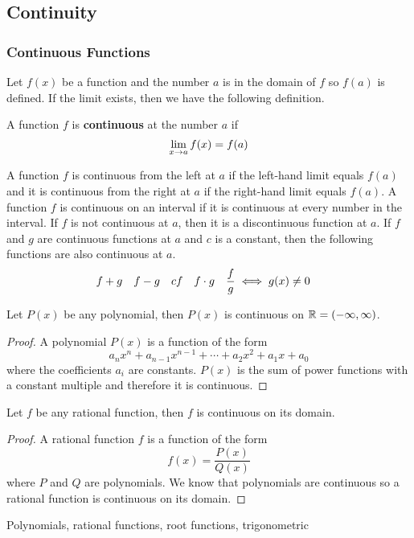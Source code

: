 \subsection{Continuity}
\subsubsection{Continuous Functions}
Let \(f(x)\) be a function and the number \(a\) is in the domain of \(f\) so
\(f(a)\) is defined.
If the limit exists, then we have the following definition.
\begin{definition}
    A function \(f\) is \textbf{continuous} at the number \(a\) if
    \[\lim_{x\to a}f(x)=f(a)\qedhere\]
\end{definition}
A function \(f\) is continuous from the left at \(a\) if the left-hand limit
equals \(f(a)\) and it is continuous from the right at \(a\) if the right-hand
limit equals \(f(a)\).
A function \(f\) is continuous on an interval if it is continuous
at every number in the interval.
If \(f\) is not continuous at \(a\), then it is a discontinuous function at \(a\).
If \(f\) and \(g\) are continuous functions at \(a\) and \(c\) is a constant,
then the following functions are also continuous at \(a\).
    \begin{align*}
        &f+g&f-g&&cf&&f\cdot g&&\dfrac{f}{g}\iff g(x)\neq 0&\qedhere
    \end{align*}
\begin{theorem}
    Let \(P(x)\) be any polynomial, then \(P(x)\) is continuous on
    \(\mathbb{R}=(-\infty,\infty)\).
\end{theorem}
\begin{proof}
    A polynomial \(P(x)\) is a function of the form
    \[a_nx^n+a_{n-1}x^{n-1}+\dotsb +a_{2}x^{2}+a_1x+a_0\]
    where the coefficients \(a_i\) are constants.
    \(P(x)\) is the sum of power functions with a constant multiple and
    therefore it is continuous.
\end{proof}
\begin{theorem}
    Let \(f\) be any rational function, then \(f\) is continuous on its domain.
\end{theorem}
\begin{proof}
    A rational function \(f\) is a function of the form
    \[f(x)=\frac{P(x)}{Q(x)}\] where \(P\) and \(Q\) are polynomials.
    We know that polynomials are continuous so a rational function is
    continuous on its domain.
\end{proof}
Polynomials, rational functions, root functions, trigonometric
